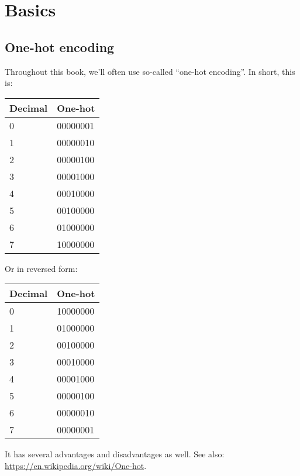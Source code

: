 \section{Basics}

\subsection{One-hot encoding}

Throughout this book, we'll often use so-called ``one-hot encoding''.
In short, this is:

\begin{center}
\begin{longtable}{ | l | l | }                                                                    
\hline
Decimal & One-hot \\
\hline
0	& 00000001 \\
1	& 00000010 \\
2	& 00000100 \\
3	& 00001000 \\
4	& 00010000 \\
5	& 00100000 \\
6	& 01000000 \\
7	& 10000000 \\
\hline
\end{longtable}
\end{center}

Or in reversed form:

\begin{center}
\begin{longtable}{ | l | l | }                                                                    
\hline
Decimal & One-hot \\
\hline
0	& 10000000 \\
1	& 01000000 \\
2	& 00100000 \\
3	& 00010000 \\
4	& 00001000 \\
5	& 00000100 \\
6	& 00000010 \\
7	& 00000001 \\
\hline
\end{longtable}
\end{center}

It has several advantages and disadvantages as well.
See also: \url{https://en.wikipedia.org/wiki/One-hot}.




